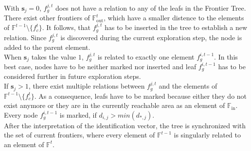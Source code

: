 \documentclass[twocolumn]{svjour3}[2016]
\begin{document}
With $\textbf{s}_j = 0$, $f^{j,t}_g$ does not have a relation to any of the leafs in the Frontier Tree. There exist other frontiers of $\mathbb{F}^t_{\textrm{out}}$, which have a smaller distence to the elements of $\mathbb{F}^{t-1}\text{\textbackslash}\{f^t_c\}$. It follows, that $f^{j,t}_g$ has to be inserted in the tree to establish a new relation. Since $f^{j,t}_g$ is discovered during the current exploration step, the node is added to the parent element.\\
When $\textbf{s}_j$ takes the value $1$, $f^{j,t}_g$ is related to exactly one element $f^{i, t-1}_g$. In this best case, nodes have to be neither marked nor inserted and leaf $f^{i, t-1}_g$ has to be considered further in future exploration steps.\\
If $\textbf{s}_j > 1$, there exist multiple relations between $f^{j,t}_g$ and the elements of $\mathbb{F}^{t-1}\text{\textbackslash}\{f^t_c\}$. As a consequence, leafs have to be marked because either they do not exist anymore or they are in the currently reachable area as an element of $\mathbb{F}_{\textrm{in}}$. Every node $f^{i,t-1}_g$ is marked, if $d_{i,j} > min(d_{*,j})$.\\
After the interpretation of the identification vector, the tree is synchronized with the set of current frontiers, where every element of $\mathbb{F}^{t-1}$ is singularly related to an element of $\mathbb{F}^t$.\\
\end{document}
